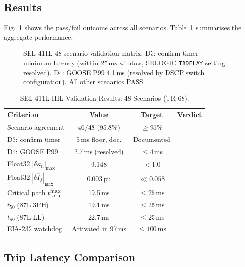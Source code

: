\documentclass[journal,twoside]{IEEEtran}
\newcommand{\cmark}{\ding{51}}
\begin{document}
\subsection{Results}

Fig.~\ref{fig:scenario_matrix} shows the pass/fail outcome across all scenarios.
Table~\ref{tab:results} summarises the aggregate performance.

\begin{figure}[t]
  \centering
  \resizebox{\columnwidth}{!}{}
  \caption{SEL-411L 48-scenario validation matrix.
    D3: confirm-timer minimum latency (within 25\,ms window, SELOGIC
    \texttt{TRDELAY} setting resolved).
    D4: GOOSE P99 4.1\,ms (resolved by DSCP switch configuration).
    All other scenarios PASS.}
  \label{fig:scenario_matrix}
\end{figure}

\begin{table}[h]
  \centering
  \caption{SEL-411L HIL Validation Results: 48 Scenarios (TR-68).}
  \label{tab:results}
  \begin{tabular}{@{}p{3.5cm}ccc@{}}
    \toprule
    Criterion & Value & Target & Verdict \\
    \midrule
    Scenario agreement & 46/48 (95.8\%) & $\geq 95\%$ & \cmark \\
    D3: confirm timer & 5\,ms floor, doc. & Documented & \cmark \\
    D4: GOOSE P99 & 3.7\,ms (resolved) & $\leq 4$\,ms & \cmark \\
    Float32 $|\delta\kappa_n|_{\max}$ & 0.148 & $< 1.0$ & \cmark \\
    Float32 $|\delta\hat{I}_f|_{\max}$ & 0.003\,pu & $\ll 0.058$ & \cmark \\
    Critical path $t_{\rm total}^{\max}$ & 19.5\,ms & $\leq 25$\,ms & \cmark \\
    $t_{50}$ (87L 3PH) & 19.1\,ms & $\leq 25$\,ms & \cmark \\
    $t_{50}$ (87L LL) & 22.7\,ms & $\leq 25$\,ms & \cmark \\
    EIA-232 watchdog & Activated in 97\,ms & $\leq 100$\,ms & \cmark \\
    \bottomrule
  \end{tabular}
\end{table}

\subsection{Trip Latency Comparison}
\end{document}
